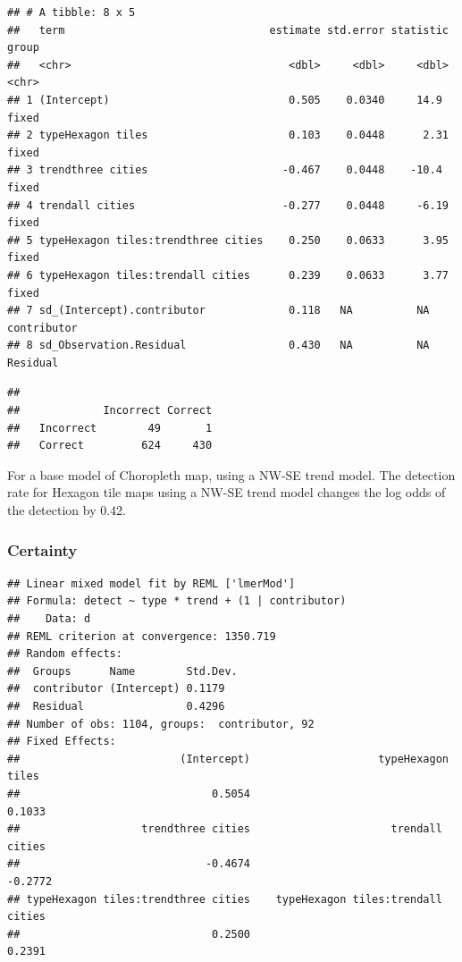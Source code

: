 \documentclass[conference,final,]{IEEEtran}
\begin{document}
\begin{verbatim}
## # A tibble: 8 x 5
##   term                                estimate std.error statistic group      
##   <chr>                                  <dbl>     <dbl>     <dbl> <chr>      
## 1 (Intercept)                            0.505    0.0340     14.9  fixed      
## 2 typeHexagon tiles                      0.103    0.0448      2.31 fixed      
## 3 trendthree cities                     -0.467    0.0448    -10.4  fixed      
## 4 trendall cities                       -0.277    0.0448     -6.19 fixed      
## 5 typeHexagon tiles:trendthree cities    0.250    0.0633      3.95 fixed      
## 6 typeHexagon tiles:trendall cities      0.239    0.0633      3.77 fixed      
## 7 sd_(Intercept).contributor             0.118   NA          NA    contributor
## 8 sd_Observation.Residual                0.430   NA          NA    Residual
\end{verbatim}

\begin{verbatim}
##            
##             Incorrect Correct
##   Incorrect        49       1
##   Correct         624     430
\end{verbatim}

For a base model of Choropleth map, using a NW-SE trend model. The
detection rate for Hexagon tile maps using a NW-SE trend model changes
the log odds of the detection by 0.42.

\hypertarget{certainty-1}{%
\subsubsection{Certainty}\label{certainty-1}}

\begin{verbatim}
## Linear mixed model fit by REML ['lmerMod']
## Formula: detect ~ type * trend + (1 | contributor)
##    Data: d
## REML criterion at convergence: 1350.719
## Random effects:
##  Groups      Name        Std.Dev.
##  contributor (Intercept) 0.1179  
##  Residual                0.4296  
## Number of obs: 1104, groups:  contributor, 92
## Fixed Effects:
##                         (Intercept)                    typeHexagon tiles  
##                              0.5054                               0.1033  
##                   trendthree cities                      trendall cities  
##                             -0.4674                              -0.2772  
## typeHexagon tiles:trendthree cities    typeHexagon tiles:trendall cities  
##                              0.2500                               0.2391
\end{verbatim}
\end{document}
